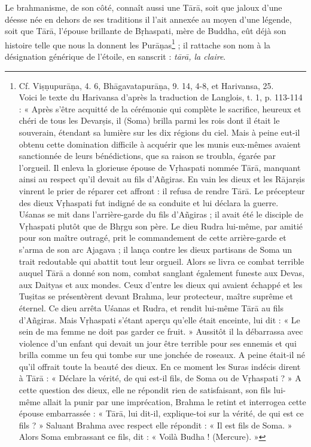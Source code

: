 \documentclass[a4paper, 11pt, oneside, french, landscape, twocolumn]{article}
\begin{document}
Le brahmanisme, de son côté, connaît aussi une T\={a}r\={a}, soit que jaloux d'une déesse née en dehors de ses traditions il l'ait annexée au moyen d'une légende, soit que T\={a}r\={a}, l'épouse brillante de B\d{r}haspati, mère de Buddha, eût déjà son histoire telle que nous la donnent les Pur\={a}\d{n}as\footnote{Cf. Vi\d{s}\d{n}upur\={a}\d{n}a, 4. 6, Bh\={a}gavatapur\={a}\d{n}a, 9. 14, 4-8, et Harivansa, 25.\\\hspace*{5mm}Voici le texte du Harivansa d'après la traduction de Langlois, t. 1, p. 113-114 : « Après s'être acquitté de la cérémonie qui complète le sacrifice, heureux et chéri de tous les Devar\d{s}is, il (Soma) brilla parmi les rois dont il était le souverain, étendant sa lumière sur les dix régions du ciel. Mais à peine eut-il obtenu cette domination difficile à acquérir que les munis eux-mêmes avaient sanctionnée de leurs bénédictions, que sa raison se troubla, égarée par l'orgueil. Il enleva la glorieuse épouse de V\d{r}haspati nommée T\={a}r\={a}, manquant ainsi au respect qu'il devait au fils d'A\~{n}giras. En vain les dieux et les R\={a}jar\d{s}is vinrent le prier de réparer cet affront : il refusa de rendre T\={a}r\={a}. Le précepteur des dieux V\d{r}haspati fut indigné de sa conduite et lui déclara la guerre. U\'{s}anas se mit dans l'arrière-garde du fils d'A\~{n}giras ; il avait été le disciple de V\d{r}haspati plutôt que de Bh\d{r}gu son père. Le dieu Rudra lui-même, par amitié pour son maître outragé, prit le commandement de cette arrière-garde et s'arma de son arc Ajagava ; il lança contre les dieux partisans de Soma un trait redoutable qui abattit tout leur orgueil. Alors se livra ce combat terrible auquel T\={a}r\={a} a donné son nom, combat sanglant également funeste aux Devas, aux Daityas et aux mondes. Ceux d'entre les dieux qui avaient échappé et les Tu\d{s}itas se présentèrent devant Brahma, leur protecteur, maître suprême et éternel. Ce dieu arrêta U\'{s}anas et Rudra, et rendit lui-même T\={a}r\={a} au fils d'A\~{n}giras. Mais V\d{r}haspati s'étant aperçu qu'elle était enceinte, lui dit : « Le sein de ma femme ne doit pas garder ce fruit. » Aussitôt il la débarrassa avec violence d'un enfant qui devait un jour être terrible pour ses ennemis et qui brilla comme un feu qui tombe sur une jonchée de roseaux. A peine était-il né qu'il offrait toute la beauté des dieux. En ce moment les Suras indécis dirent à T\={a}r\={a} : « Déclare la vérité, de qui est-il fils, de Soma ou de V\d{r}haspati ? » A cette question des dieux, elle ne répondit rien de satisfaisant, son fils lui-même allait la punir par une imprécation, Brahma le retint et interrogea cette épouse embarrassée : « T\={a}r\={a}, lui dit-il, explique-toi sur la vérité, de qui est ce fils ? » Saluant Brahma avec respect elle répondit : « Il est fils de Soma. » Alors Soma embrassant ce fils, dit : « Voilà Budha ! (Mercure). »} ; il rattache son nom à la désignation générique de l'étoile, en sanscrit : \emph{t\={a}r\={a}, la claire}.
\end{document}
